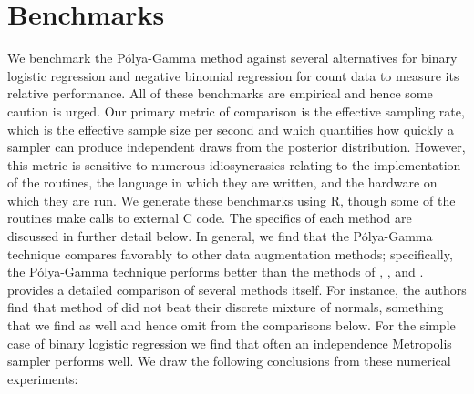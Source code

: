 \documentclass[11pt]{article}
\newcommand{\Polya}{P\'{o}lya}
\begin{document}
\section{Benchmarks}

We benchmark the \Polya-Gamma method against several alternatives for binary
logistic regression and negative binomial regression for count data to measure
its relative performance.  All of these benchmarks are empirical and hence some
caution is urged.  Our primary metric of comparison is the effective sampling
rate, which is the effective sample size per second and which quantifies how
quickly a sampler can produce independent draws from the posterior distribution.
However, this metric is sensitive to numerous idiosyncrasies relating to the
implementation of the routines, the language in which they are written, and the
hardware on which they are run.  We generate these benchmarks using R, though
some of the routines make calls to external C code.  The specifics of each
method are discussed in further detail below.  In general, we find that the
\Polya-Gamma technique compares favorably to other data augmentation methods;
specifically, the \Polya-Gamma technique performs better than the methods of
\cite{obrien-dunson-2004}, \cite{gramacy-polson-2012}, and
\cite{fruhwirth-schnatter-fruhwirth-2010}. \cite{fruhwirth-schnatter-fruhwirth-2010}
provides a detailed comparison of several methods itself.  For instance, the
authors find that method of \cite{holmes-held-2006} did not beat their discrete
mixture of normals, something that we find as well and hence omit from the
comparisons below.  For the simple case of binary logistic regression we find
that often an independence Metropolis sampler performs well.  We draw the
following conclusions from these numerical experiments:
\end{document}
